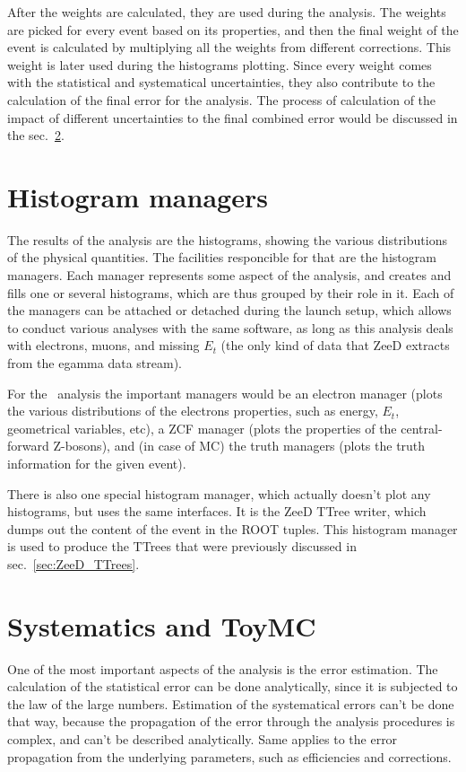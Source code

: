 After the weights are calculated, they are used during the analysis. The weights are picked for every event based on its properties, and then the final weight of the event is calculated by multiplying all the weights from different corrections. This weight is later used during the histograms plotting. Since every weight comes with the statistical and systematical uncertainties, they also contribute to the calculation of the final error for the analysis. The process of calculation of the impact of different uncertainties to the final combined error would be discussed in the sec.~\ref{sec:ZeeD_toymc}.

\section{Histogram managers}

The results of the analysis are the histograms, showing the various distributions of the physical quantities. The facilities responcible for that are the histogram managers. Each manager represents some aspect of the analysis, and creates and fills one or several histograms, which are thus grouped by their role in it. Each of the managers can be attached or detached during the launch setup, which allows to conduct various analyses with the same software, as long as this analysis deals with electrons, muons, and missing $E_{t}$ (the only kind of data that ZeeD extracts from the egamma data stream).

For the \Zee\ analysis the important managers would be an electron manager (plots the various distributions of the electrons properties, such as energy, $E_{t}$, geometrical variables, etc), a ZCF manager (plots the properties of the central-forward Z-bosons), and (in case of MC) the truth managers (plots the truth information for the given event).

There is also one special histogram manager, which actually doesn't plot any histograms, but uses the same interfaces. It is the ZeeD TTree writer, which dumps out the content of the event in the ROOT tuples. This histogram manager is used to produce the TTrees that were previously discussed in sec.~\ref{sec:ZeeD_TTrees}.

\section{Systematics and ToyMC}
\label{sec:ZeeD_toymc}

One of the most important aspects of the analysis is the error estimation. The calculation of the statistical error can be done analytically, since it is subjected to the law of the large numbers. Estimation of the systematical errors can't be done that way, because the propagation of the error through the analysis procedures is complex, and can't be described analytically. Same applies to the error propagation from the underlying parameters, such as efficiencies and corrections.

